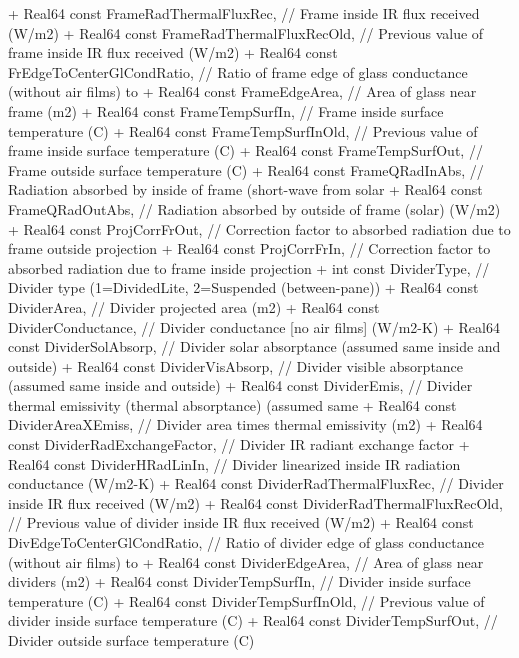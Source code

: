 \begin{DoxyCode}
+           Real64 const FrameRadThermalFluxRec, // Frame inside IR flux received (W/m2)
+           Real64 const FrameRadThermalFluxRecOld, // Previous value of frame inside IR flux received
       (W/m2)
+           Real64 const FrEdgeToCenterGlCondRatio, // Ratio of frame edge of glass conductance (without
       air films) to
+           Real64 const FrameEdgeArea, // Area of glass near frame (m2)
+           Real64 const FrameTempSurfIn, // Frame inside surface temperature (C)
+           Real64 const FrameTempSurfInOld, // Previous value of frame inside surface temperature (C)
+           Real64 const FrameTempSurfOut, // Frame outside surface temperature (C)
+           Real64 const FrameQRadInAbs, // Radiation absorbed by inside of frame (short-wave from solar
+           Real64 const FrameQRadOutAbs, // Radiation absorbed by outside of frame (solar) (W/m2)
+           Real64 const ProjCorrFrOut, // Correction factor to absorbed radiation due to frame outside
       projection
+           Real64 const ProjCorrFrIn, // Correction factor to absorbed radiation due to frame inside
       projection
+           int const DividerType, // Divider type (1=DividedLite, 2=Suspended (between-pane))
+           Real64 const DividerArea, // Divider projected area (m2)
+           Real64 const DividerConductance, // Divider conductance [no air films] (W/m2-K)
+           Real64 const DividerSolAbsorp, // Divider solar absorptance (assumed same inside and outside)
+           Real64 const DividerVisAbsorp, // Divider visible absorptance (assumed same inside and outside)
+           Real64 const DividerEmis, // Divider thermal emissivity (thermal absorptance) (assumed same
+           Real64 const DividerAreaXEmiss, // Divider area times thermal emissivity (m2)
+           Real64 const DividerRadExchangeFactor, // Divider IR radiant exchange factor
+           Real64 const DividerHRadLinIn, // Divider linearized inside IR radiation conductance (W/m2-K)
+           Real64 const DividerRadThermalFluxRec, // Divider inside IR flux received (W/m2)
+           Real64 const DividerRadThermalFluxRecOld, // Previous value of divider inside IR flux received
       (W/m2)
+           Real64 const DivEdgeToCenterGlCondRatio, // Ratio of divider edge of glass conductance (without
       air films) to
+           Real64 const DividerEdgeArea, // Area of glass near dividers (m2)
+           Real64 const DividerTempSurfIn, // Divider inside surface temperature (C)
+           Real64 const DividerTempSurfInOld, // Previous value of divider inside surface temperature (C)
+           Real64 const DividerTempSurfOut, // Divider outside surface temperature (C)

\end{DoxyCode}
